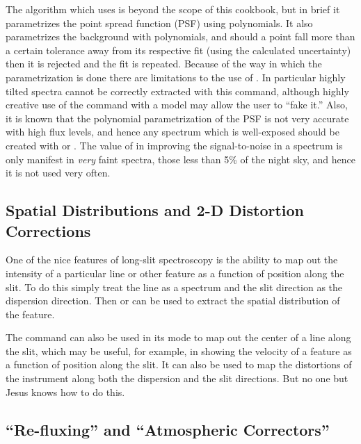 The algorithm which  uses is beyond the scope of this cookbook,
but in brief it parametrizes the point spread function (PSF) using
polynomials.  It also parametrizes the background with polynomials, and should
a point fall more than a certain tolerance away from its respective fit (using
the calculated uncertainty) then it is rejected and the fit is repeated.
Because of the way in which the parametrization is done there are limitations
to the use of .  In particular highly tilted spectra cannot be
correctly extracted with this command, although highly creative use of the
 command with a model may allow the user to ``fake it.''  Also, it
is known that the polynomial parametrization of the PSF is not very accurate
with high flux levels, and hence any spectrum which is well-exposed should be
created with  or . The value of  in
improving the signal-to-noise in a spectrum is only manifest in {\it very}
faint spectra, those less than 5\% of the night sky, and hence it is not used
very often.

\subsection{Spatial Distributions and 2-D Distortion Corrections}

One of the nice features of long-slit spectroscopy is the ability to map out
the intensity of a particular line or other feature as a function of position
along the slit.  To do this simply treat the line as a spectrum and the slit
direction as the dispersion direction.  Then  or 
can be used to extract the spatial distribution of the feature.

The  command can also be used in its  mode to map
out the center of a line along the slit, which may be useful, for example, in
showing the velocity of a feature as a function of position along the slit.
It can also be used to map the distortions of the instrument along both the
dispersion and the slit directions.  But no one but Jesus knows how to do
this.

\subsection{``Re-fluxing'' and ``Atmospheric Correctors''}


